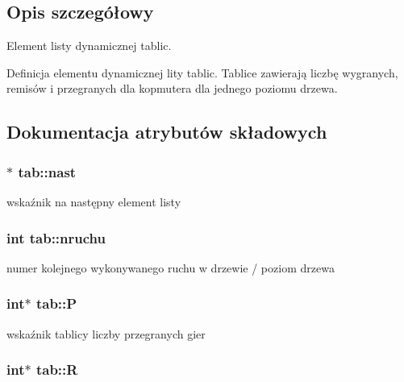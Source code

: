 \subsection{Opis szczegółowy}
Element listy dynamicznej tablic. 

Definicja elementu dynamicznej lity tablic. Tablice zawierają liczbę wygranych, remisów i przegranych dla kopmutera dla jednego poziomu drzewa. 

\subsection{Dokumentacja atrybutów składowych}
\subsubsection[{\texorpdfstring{nast}{nast}}]{$\ast$ tab\+::nast}\hypertarget{structtab_abca0375dfae9e97ee6b0457d3b562ac9}{}\label{structtab_abca0375dfae9e97ee6b0457d3b562ac9}


wskaźnik na następny element listy 

\subsubsection[{\texorpdfstring{nruchu}{nruchu}}]{\setlength{\rightskip}{0pt plus 5cm}int tab\+::nruchu}\hypertarget{structtab_a8b52ff4e9a57646f4890690e1266c16f}{}\label{structtab_a8b52ff4e9a57646f4890690e1266c16f}


numer kolejnego wykonywanego ruchu w drzewie / poziom drzewa 

\subsubsection[{\texorpdfstring{P}{P}}]{\setlength{\rightskip}{0pt plus 5cm}int$\ast$ tab\+::P}\hypertarget{structtab_aa99978b9e36e661312d4ac4581421a28}{}\label{structtab_aa99978b9e36e661312d4ac4581421a28}


wskaźnik tablicy liczby przegranych gier 

\subsubsection[{\texorpdfstring{R}{R}}]{\setlength{\rightskip}{0pt plus 5cm}int$\ast$ tab\+::R}\hypertarget{structtab_acc9e4ee7e5e6df2449875e0a1dc67b18}{}\label{structtab_acc9e4ee7e5e6df2449875e0a1dc67b18}


